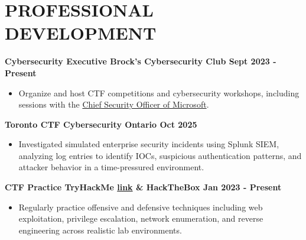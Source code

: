 \documentclass[11pt]{article}
\begin{document}
\section*{PROFESSIONAL DEVELOPMENT}
\textbf{Cybersecurity Executive \textbar{} Brock's Cybersecurity Club \textbar{} Sept 2023 - Present} 
\begin{itemize}[leftmargin=1.5em, topsep=0pt,itemsep=0pt, parsep=0pt]
\item    Organize and host CTF competitions and cybersecurity workshops, including sessions with the \href{https://experiencebu.brocku.ca/event/260543}{Chief Security Officer of Microsoft}.

\end{itemize}
\textbf{Toronto CTF \textbar{} Cybersecurity Ontario \textbar{} Oct 2025} 
\begin{itemize}[leftmargin=1.5em, topsep=0pt,itemsep=0pt, parsep=0pt]
\item    Investigated simulated enterprise security incidents using Splunk SIEM, analyzing log entries to identify IOCs, suspicious authentication patterns, and attacker behavior in a time-pressured environment.

\end{itemize}
\textbf{CTF Practice \textbar{} TryHackMe \href{https://tryhackme.com/p/Jeffin14}{link} \& HackTheBox \textbar{} Jan 2023 - Present} 
\begin{itemize}[leftmargin=1.5em, topsep=0pt,itemsep=0pt, parsep=0pt]
\item    Regularly practice offensive and defensive techniques including web exploitation, privilege escalation, network enumeration, and reverse engineering across realistic lab environments.

\end{itemize}
\end{document}
